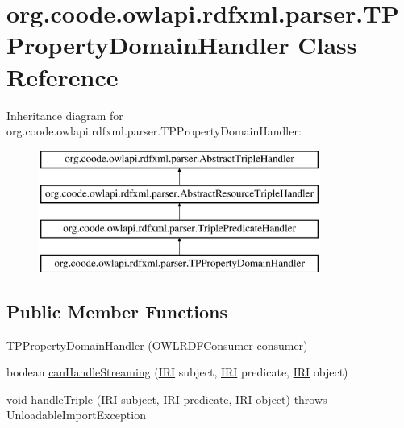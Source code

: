 \hypertarget{classorg_1_1coode_1_1owlapi_1_1rdfxml_1_1parser_1_1_t_p_property_domain_handler}{\section{org.\-coode.\-owlapi.\-rdfxml.\-parser.\-T\-P\-Property\-Domain\-Handler Class Reference}
\label{classorg_1_1coode_1_1owlapi_1_1rdfxml_1_1parser_1_1_t_p_property_domain_handler}
}
Inheritance diagram for org.\-coode.\-owlapi.\-rdfxml.\-parser.\-T\-P\-Property\-Domain\-Handler\-:\begin{figure}[H]
\begin{center}
\leavevmode
\includegraphics[height=4.000000cm]{classorg_1_1coode_1_1owlapi_1_1rdfxml_1_1parser_1_1_t_p_property_domain_handler}
\end{center}
\end{figure}
\subsection*{Public Member Functions}
\begin{DoxyCompactItemize}
\item 
\hyperlink{classorg_1_1coode_1_1owlapi_1_1rdfxml_1_1parser_1_1_t_p_property_domain_handler_a426d2d76d17e97558fd0f38451420ba4}{T\-P\-Property\-Domain\-Handler} (\hyperlink{classorg_1_1coode_1_1owlapi_1_1rdfxml_1_1parser_1_1_o_w_l_r_d_f_consumer}{O\-W\-L\-R\-D\-F\-Consumer} \hyperlink{classorg_1_1coode_1_1owlapi_1_1rdfxml_1_1parser_1_1_abstract_triple_handler_a4ccf4d898ff01eb1cadfa04b23d54e9c}{consumer})
\item 
boolean \hyperlink{classorg_1_1coode_1_1owlapi_1_1rdfxml_1_1parser_1_1_t_p_property_domain_handler_ae38b114c33d56a54cbc3d871f5f91093}{can\-Handle\-Streaming} (\hyperlink{classorg_1_1semanticweb_1_1owlapi_1_1model_1_1_i_r_i}{I\-R\-I} subject, \hyperlink{classorg_1_1semanticweb_1_1owlapi_1_1model_1_1_i_r_i}{I\-R\-I} predicate, \hyperlink{classorg_1_1semanticweb_1_1owlapi_1_1model_1_1_i_r_i}{I\-R\-I} object)
\item 
void \hyperlink{classorg_1_1coode_1_1owlapi_1_1rdfxml_1_1parser_1_1_t_p_property_domain_handler_a0017a13d8ac9c43ebf47da33e6863897}{handle\-Triple} (\hyperlink{classorg_1_1semanticweb_1_1owlapi_1_1model_1_1_i_r_i}{I\-R\-I} subject, \hyperlink{classorg_1_1semanticweb_1_1owlapi_1_1model_1_1_i_r_i}{I\-R\-I} predicate, \hyperlink{classorg_1_1semanticweb_1_1owlapi_1_1model_1_1_i_r_i}{I\-R\-I} object)  throws Unloadable\-Import\-Exception 
\end{DoxyCompactItemize}

